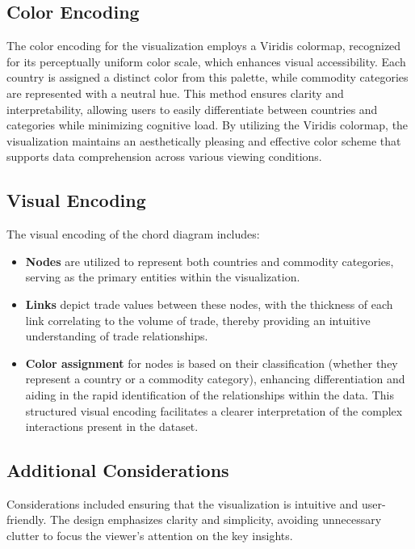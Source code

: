 \documentclass{article}
\begin{document}
\subsection{Color Encoding}
The color encoding for the visualization employs a Viridis colormap, recognized for its perceptually uniform color scale, which enhances visual accessibility. Each country is assigned a distinct color from this palette, while commodity categories are represented with a neutral hue. This method ensures clarity and interpretability, allowing users to easily differentiate between countries and categories while minimizing cognitive load. By utilizing the Viridis colormap, the visualization maintains an aesthetically pleasing and effective color scheme that supports data comprehension across various viewing conditions.

\subsection{Visual Encoding}
The visual encoding of the chord diagram includes:
\begin{itemize}
    \item \textbf{Nodes} are utilized to represent both countries and commodity categories, serving as the primary entities within the visualization.
    
    \item \textbf{Links} depict trade values between these nodes, with the thickness of each link correlating to the volume of trade, thereby providing an intuitive understanding of trade relationships.
    
    \item \textbf{Color assignment} for nodes is based on their classification (whether they represent a country or a commodity category), enhancing differentiation and aiding in the rapid identification of the relationships within the data. This structured visual encoding facilitates a clearer interpretation of the complex interactions present in the dataset.
\end{itemize}

\subsection{Additional Considerations}
Considerations included ensuring that the visualization is intuitive and user-friendly. The design emphasizes clarity and simplicity, avoiding unnecessary clutter to focus the viewer’s attention on the key insights.
\end{document}
